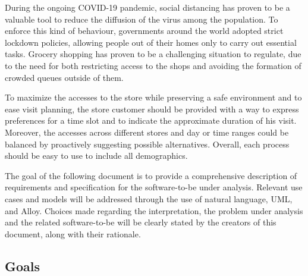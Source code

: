 \documentclass[../../main.tex]{subfiles}
\begin{document}
During the ongoing COVID-19 pandemic, social distancing has proven to be a valuable tool to reduce the diffusion of the virus among the population. To enforce this kind of behaviour,
governments around the world adopted strict lockdown policies, allowing people out of their homes only to carry out essential tasks.
Grocery shopping has proven to be a challenging situation to regulate, due to the need for both restricting access to the shops and 
avoiding the formation of crowded queues outside of them.

To maximize the accesses to the store while preserving a safe environment and to ease visit planning, the store customer should be provided with a way to express preferences for a time slot 
and to indicate the approximate duration of his visit.
Moreover, the accesses across different stores and day or time ranges could be balanced by proactively suggesting possible alternatives.
Overall, each process should be easy to use to include all demographics.

The goal of the following document is to provide a comprehensive description of requirements and specification for the software-to-be under analysis. 
Relevant use cases and models will be addressed through the use of natural language, UML, and Alloy. 
Choices made regarding the interpretation, the problem under analysis and the related software-to-be will be clearly stated by the creators of this document, along with their rationale.

\subsection{Goals}

\end{document}

